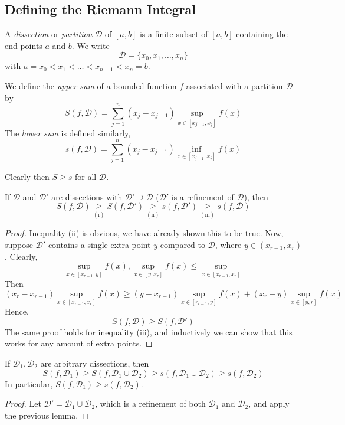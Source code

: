 \documentclass{article}
\begin{document}
\subsection{Defining the Riemann Integral}
\begin{definition}
	A \textit{dissection} or \textit{partition} $\mathcal D$ of $[a, b]$ is a finite subset of $[a, b]$ containing the end points $a$ and $b$. We write
	\[ \mathcal D = \{ x_0, x_1, \dots, x_n \} \]
	with $a = x_0 < x_1 < \dots < x_{n-1} < x_n = b$.
\end{definition}
\begin{definition}
	We define the \textit{upper sum} of a bounded function $f$ associated with a partition $\mathcal D$ by
	\[ S(f, \mathcal D) = \sum_{j=1}^n (x_j - x_{j-1}) \sup_{x \in [x_{j-1}, x_j]} f(x) \]
	The \textit{lower sum} is defined similarly,
	\[ s(f, \mathcal D) = \sum_{j=1}^n (x_j - x_{j-1}) \inf_{x \in [x_{j-1}, x_j]} f(x) \]
\end{definition}
\noindent Clearly then $S \geq s$ for all $\mathcal D$.
\begin{lemma}
	If $\mathcal D$ and $\mathcal D'$ are dissections with $\mathcal D' \supseteq \mathcal D$ ($\mathcal D'$ is a refinement of $\mathcal D$), then
	\[ S(f, \mathcal D) \underset{(\mathrm{i})}{\geq} S(f, \mathcal D') \underset{(\mathrm{ii})}{\geq} s(f, \mathcal D') \underset{(\mathrm{iii})}{\geq} s(f, \mathcal D) \]
\end{lemma}
\begin{proof}
	Inequality (ii) is obvious, we have already shown this to be true. Now, suppose $\mathcal D'$ contains a single extra point $y$ compared to $\mathcal D$, where $y \in (x_{r-1}, x_r)$. Clearly,
	\[ \sup_{x \in [x_{r-1}, y]} f(x), \sup_{x \in [y, x_r]} f(x) \leq \sup_{x \in [x_{r-1}, x_r]} \]
	Then
	\[ (x_r - x_{r-1}) \sup_{x \in [x_{r-1}, x_r]} f(x) \geq (y-x_{r-1}) \sup_{x \in [r_{r-1}, y]} f(x) + (x_r - y) \sup_{x \in [y, r]} f(x) \]
	Hence,
	\[ S(f, \mathcal D) \geq S(f, \mathcal D') \]
	The same proof holds for inequality (iii), and inductively we can show that this works for any amount of extra points.
\end{proof}
\begin{lemma}
	If $\mathcal D_1, \mathcal D_2$ are arbitrary dissections, then
	\[ S(f, \mathcal D_1) \geq S(f, \mathcal D_1 \cup \mathcal D_2) \geq s(f, \mathcal D_1 \cup \mathcal D_2) \geq s(f, \mathcal D_2) \]
	In particular, $S(f, \mathcal D_1) \geq s(f, \mathcal D_2)$.
\end{lemma}
\begin{proof}
	Let $\mathcal D' = \mathcal D_1 \cup \mathcal D_2$, which is a refinement of both $\mathcal D_1$ and $\mathcal D_2$, and apply the previous lemma.
\end{proof}
\end{document}
